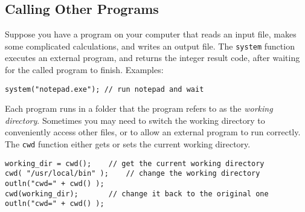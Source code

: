\documentclass{article}
\begin{document}



%   

\subsection{Calling Other Programs}

Suppose you have a program on your computer that reads an input file, makes some complicated calculations, and writes an output file.  The \texttt{system} function executes an external program, and returns the integer result code, after waiting for the called program to finish.  Examples:

\begin{verbatim}
system("notepad.exe"); // run notepad and wait
\end{verbatim}

Each program runs in a folder that the program refers to as the \emph{working directory}.  Sometimes you may need to switch the working directory to conveniently access other files, or to allow an external program to run correctly.  The \texttt{cwd} function either gets or sets the current working directory.

\begin{verbatim}
working_dir = cwd();    // get the current working directory
cwd( "/usr/local/bin" );    // change the working directory
outln("cwd=" + cwd() );
cwd(working_dir);       // change it back to the original one
outln("cwd=" + cwd() );
\end{verbatim}
\end{document}
